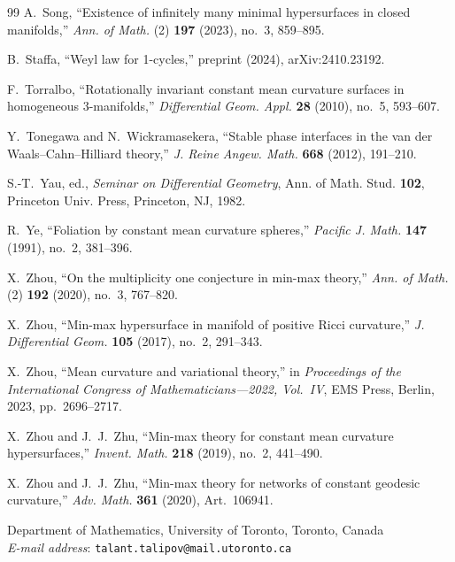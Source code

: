 \documentclass[12pt,english]{article}
\theoremstyle{definition}
\begin{document}
\begin{thebibliography}{99}
 A.~Song, ``Existence of infinitely many minimal hypersurfaces in closed manifolds,'' \textit{Ann. of Math.} (2) \textbf{197} (2023), no.~3, 859--895.

 B.~Staffa, ``Weyl law for 1-cycles,'' preprint (2024), arXiv:2410.23192.

 F.~Torralbo, ``Rotationally invariant constant mean curvature surfaces in homogeneous $3$-manifolds,'' \textit{Differential Geom. Appl.} \textbf{28} (2010), no.~5, 593--607.

 Y.~Tonegawa and N.~Wickramasekera, ``Stable phase interfaces in the van der Waals--Cahn--Hilliard theory,'' \textit{J. Reine Angew. Math.} \textbf{668} (2012), 191--210.

 S.-T.~Yau, ed., \textit{Seminar on Differential Geometry}, Ann. of Math. Stud. \textbf{102}, Princeton Univ. Press, Princeton, NJ, 1982.

 R.~Ye, ``Foliation by constant mean curvature spheres,'' \textit{Pacific J. Math.} \textbf{147} (1991), no.~2, 381--396.

 X.~Zhou, ``On the multiplicity one conjecture in min-max theory,'' \textit{Ann. of Math.} (2) \textbf{192} (2020), no.~3, 767--820.

 X.~Zhou, ``Min-max hypersurface in manifold of positive Ricci curvature,'' \textit{J. Differential Geom.} \textbf{105} (2017), no.~2, 291--343.

 X.~Zhou, ``Mean curvature and variational theory,'' in \textit{Proceedings of the International Congress of Mathematicians---2022, Vol.~IV}, EMS Press, Berlin, 2023, pp.~2696--2717.

 X.~Zhou and J.~J.~Zhu, ``Min-max theory for constant mean curvature hypersurfaces,'' \textit{Invent. Math.} \textbf{218} (2019), no.~2, 441--490.

 X.~Zhou and J.~J.~Zhu, ``Min-max theory for networks of constant geodesic curvature,'' \textit{Adv. Math.} \textbf{361} (2020), Art.~106941.

\end{thebibliography}


\vspace{0.5cm}
\noindent Department of Mathematics, University of Toronto, Toronto, Canada\\
\textit{E-mail address}: \texttt{talant.talipov@mail.utoronto.ca}
\end{document}
